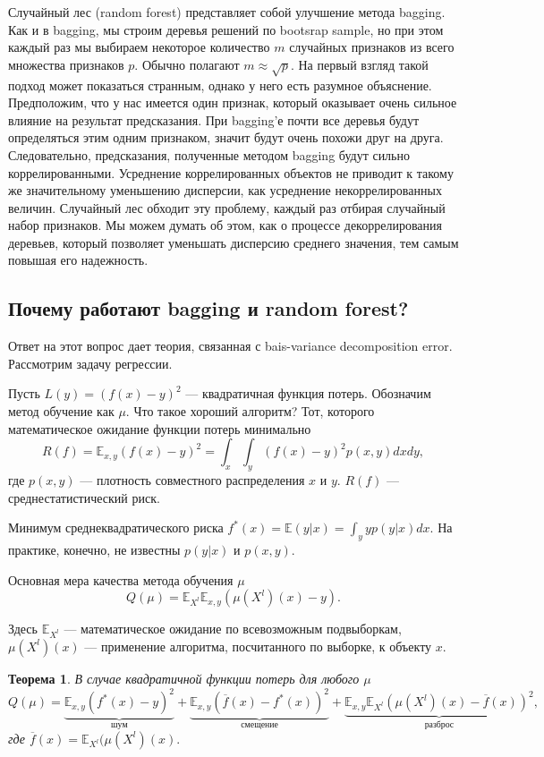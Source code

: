 \documentclass[14pt, a4paper]{article}
\newtheorem{theorem}{Теорема}
\begin{document}
Случайный лес (random forest) представляет собой улучшение метода bagging. Как и в bagging, мы строим деревья решений по bootsrap sample, но при этом каждый раз мы выбираем некоторое количество $m$ случайных признаков из всего множества признаков $p$. Обычно полагают $m \approx \sqrt{p}$. На первый взгляд такой подход может показаться странным, однако у него есть разумное объяснение. Предположим, что у нас имеется один признак, который оказывает очень сильное влияние на результат предсказания. При bagging'е почти все деревья будут определяться этим одним признаком, значит будут очень похожи друг на друга. Следовательно, предсказания, полученные методом bagging будут сильно коррелированными. Усреднение коррелированных объектов не приводит к такому же значительному уменьшению дисперсии, как усреднение некоррелированных величин. Случайный лес обходит эту проблему, каждый раз отбирая случайный набор признаков. Мы можем думать об этом, как о процессе декоррелирования деревьев, который позволяет уменьшать дисперсию среднего значения, тем самым повышая его надежность.

\subsection{Почему работают bagging и random forest?}

Ответ на этот вопрос дает теория, связанная с bais-variance decomposition error. Рассмотрим задачу регрессии. 

Пусть $L(y) = (f(x) - y)^2$ --- квадратичная функция потерь. Обозначим метод обучение как $\mu$. Что такое хороший алгоритм? Тот, которого математическое ожидание функции потерь минимально 
$$R(f) = \mathbb{E}_{x,y}(f(x) - y)^2 = \int_x \int_y (f(x) - y)^2 p(x,y) dx dy, $$ где $p(x,y)$ --- плотность совместного распределения $x$ и $y$. $R(f)$ --- среднестатистический риск.

Минимум среднеквадратического риска $f^{*}(x) = \mathbb{E}(y|x) = \int_y y p(y|x) dx$. На практике, конечно, не известны $p(y|x)$ и $p(x,y)$.

Основная мера качества метода обучения $\mu$ 
$$Q(\mu) = \mathbb{E}_{X^l} \mathbb{E}_{x,y}(\mu(X^l)(x) - y).$$

Здесь $\mathbb{E}_{X^l}$ --- математическое ожидание по всевозможным подвыборкам, $\mu(X^l)(x)$ --- применение алгоритма, посчитанного по выборке, к объекту $x$.

\begin{theorem}
В случае квадратичной функции потерь для любого $\mu$
\begin{equation*}
Q(\mu) = \underbrace{\mathbb{E}_{x,y} (f^{*}(x) - y)^2}_{\text{шум}} +  \underbrace{\mathbb{E}_{x,y} (\overline{f}(x) - f^{*}(x))^2}_{\text{смещение}} + \underbrace{ \mathbb{E}_{x,y}\mathbb{E}_{X^l}(\mu(X^l)(x) - \overline{f}(x))^2}_{\text{разброс}},
\end{equation*}
где $\overline{f}(x) = \mathbb{E}_{X^l}(\mu(X^l)(x).$
\end{theorem}
\end{document}
